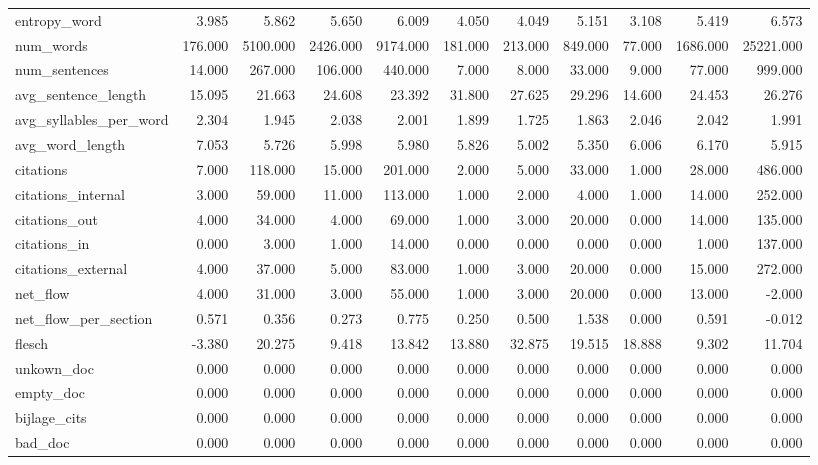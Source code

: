 \begin{tabular}{lrrrrrrrrrr}
\cline{1-11}
entropy\_word & 3.985 & 5.862 & 5.650 & 6.009 & 4.050 & 4.049 & 5.151 & 3.108 & 5.419 & 6.573 \\
\cline{1-11}
num\_words & 176.000 & 5100.000 & 2426.000 & 9174.000 & 181.000 & 213.000 & 849.000 & 77.000 & 1686.000 & 25221.000 \\
\cline{1-11}
num\_sentences & 14.000 & 267.000 & 106.000 & 440.000 & 7.000 & 8.000 & 33.000 & 9.000 & 77.000 & 999.000 \\
\cline{1-11}
avg\_sentence\_length & 15.095 & 21.663 & 24.608 & 23.392 & 31.800 & 27.625 & 29.296 & 14.600 & 24.453 & 26.276 \\
\cline{1-11}
avg\_syllables\_per\_word & 2.304 & 1.945 & 2.038 & 2.001 & 1.899 & 1.725 & 1.863 & 2.046 & 2.042 & 1.991 \\
\cline{1-11}
avg\_word\_length & 7.053 & 5.726 & 5.998 & 5.980 & 5.826 & 5.002 & 5.350 & 6.006 & 6.170 & 5.915 \\
\cline{1-11}
citations & 7.000 & 118.000 & 15.000 & 201.000 & 2.000 & 5.000 & 33.000 & 1.000 & 28.000 & 486.000 \\
\cline{1-11}
citations\_internal & 3.000 & 59.000 & 11.000 & 113.000 & 1.000 & 2.000 & 4.000 & 1.000 & 14.000 & 252.000 \\
\cline{1-11}
citations\_out & 4.000 & 34.000 & 4.000 & 69.000 & 1.000 & 3.000 & 20.000 & 0.000 & 14.000 & 135.000 \\
\cline{1-11}
citations\_in & 0.000 & 3.000 & 1.000 & 14.000 & 0.000 & 0.000 & 0.000 & 0.000 & 1.000 & 137.000 \\
\cline{1-11}
citations\_external & 4.000 & 37.000 & 5.000 & 83.000 & 1.000 & 3.000 & 20.000 & 0.000 & 15.000 & 272.000 \\
\cline{1-11}
net\_flow & 4.000 & 31.000 & 3.000 & 55.000 & 1.000 & 3.000 & 20.000 & 0.000 & 13.000 & -2.000 \\
\cline{1-11}
net\_flow\_per\_section & 0.571 & 0.356 & 0.273 & 0.775 & 0.250 & 0.500 & 1.538 & 0.000 & 0.591 & -0.012 \\
\cline{1-11}
flesch & -3.380 & 20.275 & 9.418 & 13.842 & 13.880 & 32.875 & 19.515 & 18.888 & 9.302 & 11.704 \\
\cline{1-11}
unkown\_doc & 0.000 & 0.000 & 0.000 & 0.000 & 0.000 & 0.000 & 0.000 & 0.000 & 0.000 & 0.000 \\
\cline{1-11}
empty\_doc & 0.000 & 0.000 & 0.000 & 0.000 & 0.000 & 0.000 & 0.000 & 0.000 & 0.000 & 0.000 \\
\cline{1-11}
bijlage\_cits & 0.000 & 0.000 & 0.000 & 0.000 & 0.000 & 0.000 & 0.000 & 0.000 & 0.000 & 0.000 \\
\cline{1-11}
bad\_doc & 0.000 & 0.000 & 0.000 & 0.000 & 0.000 & 0.000 & 0.000 & 0.000 & 0.000 & 0.000 \\
\cline{1-11}
\bottomrule
\end{tabular}
